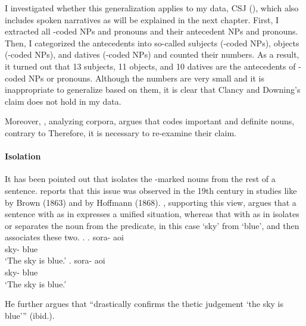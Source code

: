 I investigated whether this generalization applies to
my data, CSJ (), which also includes spoken narratives as will be explained in the next chapter.
First, I extracted all -coded NPs and pronouns and their antecedent NPs and pronouns.
Then, I categorized the antecedents into
so-called subjects (-coded NPs),
objects (-coded NPs), and datives (-coded NPs) and
counted their numbers.
As a result,
it turned out that
13 subjects, 11 objects, and 10 datives are the antecedents of
-coded NPs or pronouns.
Although the numbers are very small and it is inappropriate to generalize based on them,
it is clear that
Clancy and Downing's claim does not hold in my data.

Moreover, , analyzing corpora, argues that
 codes important and definite nouns, contrary to 
Therefore, it is necessary to re-examine their claim.


\paragraph{Isolation}


It has been pointed out that
 isolates the -marked nouns from the rest of a sentence.
 reports that this issue was observed in the 19th century
in studies like  by Brown (1863) and
 by Hoffmann (1868).
, supporting this view,
argues that a sentence with  as in \Next[a] expresses a unified situation,
whereas that with  as in \Next[b] isolates or separates
the noun from the predicate,
in this case
 `sky' from  `blue',
and then associates these two.
%
\ex.
 \ag. sora- aoi \\
      sky- blue \\
      `The sky is blue.'
 \bg. sora- aoi \\
      sky- blue \\
      `The sky is blue.'

He further argues that
 ``drastically confirms the thetic judgement `the sky is blue'{''} (ibid.).

